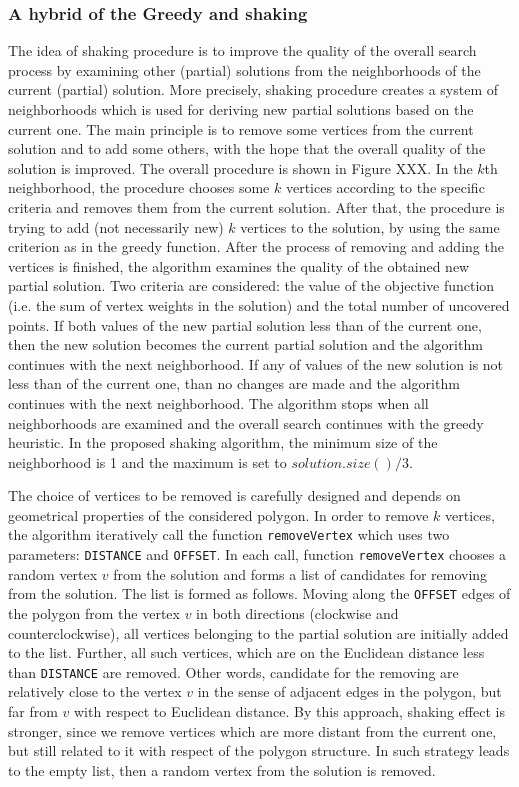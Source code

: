 \documentclass[runningheads,a4paper]{elsarticle}
\begin{document}
	\subsubsection{A hybrid of the Greedy and shaking}
The idea of shaking procedure is to improve the quality of the overall search process by examining other (partial) solutions from the neighborhoods of the current (partial) solution. More precisely,
shaking procedure creates a system of neighborhoods which is used for deriving new partial solutions based on the current one. The main principle  is to remove some vertices from the current solution and to add some others, with the hope that the overall quality of the solution is improved.
 The overall procedure is shown in Figure XXX. In the $k$th neighborhood, the procedure chooses some $k$ vertices according to the specific criteria and removes them from the current solution. After that, the procedure is trying to add (not necessarily new) $k$ vertices to the solution, by using the same criterion as in the greedy function. After the process of removing and adding the vertices is finished, the algorithm examines the quality of the obtained new partial solution. Two criteria are considered: the value of the objective function (i.e. the sum of vertex weights in the solution) and the total number of uncovered points. If both values of the new partial solution less than of the current one, then the new solution becomes the current partial solution and the algorithm continues with the next neighborhood. If any of values of the new solution is not less than of the current one, than no changes are made and the algorithm continues with the next neighborhood. The algorithm stops when all neighborhoods are examined and the overall search continues with the greedy heuristic. In the proposed shaking algorithm, the minimum size of the neighborhood is 1 and the maximum is set to $solution.size()/3$.

The choice of vertices to be removed is carefully designed and depends on geometrical properties of the considered polygon. In order to remove $k$ vertices, the algorithm iteratively call the function \texttt{removeVertex} which uses two parameters: \texttt{DISTANCE} and \texttt{OFFSET}. In each call, function \texttt{removeVertex} chooses a random vertex $v$ from the solution and forms a list of candidates for removing from the solution. The list is formed as follows. Moving along the \texttt{OFFSET} edges of the polygon from the vertex $v$ in both directions (clockwise and counterclockwise), all vertices belonging to the partial solution are initially added to the list. Further, all such vertices, which are on the Euclidean distance less than \texttt{DISTANCE} are removed. Other words, candidate for the removing are relatively close to the vertex $v$ in the sense of adjacent edges in the polygon, but far from $v$ with respect to Euclidean distance. By this approach, shaking effect is stronger, since we remove vertices which are more distant from the current one, but still related to it with respect of the polygon structure. In such strategy leads to the empty list, then a random vertex from the solution is removed.
\end{document}
